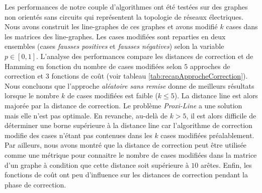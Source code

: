 
Les performances de notre couple d'algorithmes ont \'et\'e test\'ees sur des graphes non orient\'es sans circuits qui repr\'esentent la topologie de r\'eseaux \'electriques. Nous avons construit les line-graphes de ces graphes et avons modifi\'e $k$ cases dans les matrices des line-graphes. Les cases modifi\'ees sont reparties en deux ensembles (cases {\em fausses positives} et {\em fausses n\'egatives}) selon la variable $p \in [0,1]$.
L'analyse des performances compare les distances de correction et de Hamming en fonction du nombre de cases modifi\'ees selon $5$ approches de correction et $3$ fonctions de co\^ut (voir tableau \ref{tab:recapApprocheCorrection}). 
Nous concluons que l'approche {\em al\'eatoire sans remise} donne de meilleurs r\'esultats lorsque le nombre $k$ de cases modifi\'ees est faible ($k\le 5$). La distance line est alors major\'ee par la distance de correction.  Le probl\`eme {\em Proxi-Line} a une solution mais elle n'est pas optimale.
En revanche, au-del\`a de $k > 5$, il est alors difficile de d\'eterminer une borne sup\'erieure \`a la distance line car l'algorithme de correction  modifie des cases n'\'etant pas contenues dans les $k$ cases modifi\'ees pr\'ealablement. 
Par ailleurs, nous avons montr\'e que la distance de correction peut \^etre utilis\'ee comme une m\'etrique pour connaitre le nombre de cases modifi\'ees dans la matrice d'un graphe \`a condition que cette distance soit sup\'erieure \`a $10$ ar\^etes. 
Enfin, les fonctions de co\^ut ont peu d'influence sur les distances de correction pendant la phase de correction.

